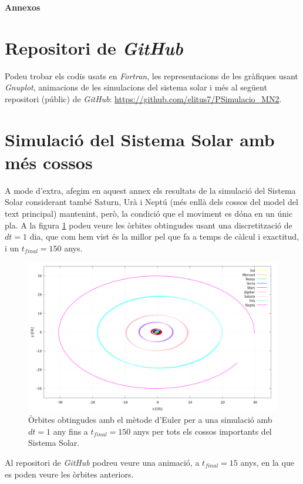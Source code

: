 \documentclass[10pt, twoside, a4paper]{article}
\begin{document}
\newpage
\appendix
{\Huge{\textbf{Annexos}}}
\section{Repositori de \textit{GitHub}}
\label{an:a}
Podeu trobar els codis usats en \textit{Fortran}, les representacions de les gràfiques usant \textit{Gnuplot}, animacions de les simulacions del sistema solar i més al següent repositori (públic) de \textit{GitHub}: \url{https://github.com/elitus7/PSimulacio_MN2}.

\section{Simulació del Sistema Solar amb més cossos}
\label{an:b}
A mode d'extra, afegim en aquest annex els resultats de la simulació del Sistema Solar considerant també Saturn, Urà i Neptú (més enllà dels cossos del model del text principal) mantenint, però, la condició que el moviment es dóna en un únic pla. A la figura \ref{fig:an1} podeu veure les òrbites obtingudes usant una discretització de $dt=1$ dia, que com hem vist és la millor pel que fa a temps de càlcul i exactitud, i un $t_{final}=150$ anys.

\begin{figure}[h]
    \centering
    \includegraphics[width=1.0\linewidth]{../sist_solar/orbites_euler_TOTS_150_d1dia.png}
    \caption{Òrbites obtingudes amb el mètode d'Euler per a una simulació amb $dt=1$ any fins a $t_{final}=150$ anys per tots els cossos importants del Sistema Solar.}
    \label{fig:an1}
\end{figure}

Al repositori de \textit{GitHub} podreu veure una animació, a $t_{final}=15$ anys, en la que es poden veure les òrbites anteriors.
\end{document}
